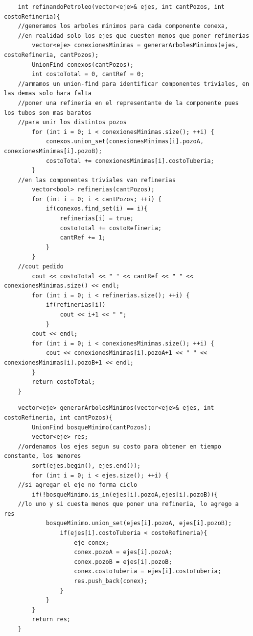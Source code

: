 	\begin{codesnippet}
	\begin{verbatim}
    int refinandoPetroleo(vector<eje>& ejes, int cantPozos, int costoRefineria){
    //generamos los arboles minimos para cada componente conexa, 
    //en realidad solo los ejes que cuesten menos que poner refinerias
        vector<eje> conexionesMinimas = generarArbolesMinimos(ejes, costoRefineria, cantPozos);
        UnionFind conexos(cantPozos);
        int costoTotal = 0, cantRef = 0;
    //armamos un union-find para identificar componentes triviales, en las demas solo hara falta 
    //poner una refineria en el representante de la componente pues los tubos son mas baratos 
    //para unir los distintos pozos
        for (int i = 0; i < conexionesMinimas.size(); ++i) {
            conexos.union_set(conexionesMinimas[i].pozoA, conexionesMinimas[i].pozoB);
            costoTotal += conexionesMinimas[i].costoTuberia;
        }
    //en las componentes triviales van refinerias
        vector<bool> refinerias(cantPozos);
        for (int i = 0; i < cantPozos; ++i) {
            if(conexos.find_set(i) == i){
                refinerias[i] = true;
                costoTotal += costoRefineria;
                cantRef += 1;
            }
        }
    //cout pedido
        cout << costoTotal << " " << cantRef << " " << conexionesMinimas.size() << endl;
        for (int i = 0; i < refinerias.size(); ++i) {
            if(refinerias[i])
                cout << i+1 << " ";
            }
        cout << endl;
        for (int i = 0; i < conexionesMinimas.size(); ++i) {
            cout << conexionesMinimas[i].pozoA+1 << " " << conexionesMinimas[i].pozoB+1 << endl;
        }
        return costoTotal;
    }
	\end{verbatim}
	\end{codesnippet}

	\begin{codesnippet}
	\begin{verbatim}
    vector<eje> generarArbolesMinimos(vector<eje>& ejes, int costoRefineria, int cantPozos){
        UnionFind bosqueMinimo(cantPozos);
        vector<eje> res;
    //ordenamos los ejes segun su costo para obtener en tiempo constante, los menores
        sort(ejes.begin(), ejes.end());
        for (int i = 0; i < ejes.size(); ++i) {
    //si agregar el eje no forma ciclo
        if(!bosqueMinimo.is_in(ejes[i].pozoA,ejes[i].pozoB)){
    //lo uno y si cuesta menos que poner una refineria, lo agrego a res
            bosqueMinimo.union_set(ejes[i].pozoA, ejes[i].pozoB);
                if(ejes[i].costoTuberia < costoRefineria){
                    eje conex;
                    conex.pozoA = ejes[i].pozoA;
                    conex.pozoB = ejes[i].pozoB;
                    conex.costoTuberia = ejes[i].costoTuberia;
                    res.push_back(conex);
                }
            }
        }
        return res;
    }
	\end{verbatim}
	\end{codesnippet}

